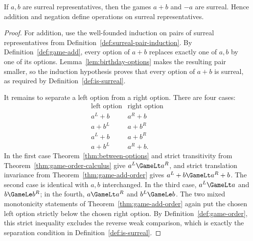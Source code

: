 \begin{theorem}
  \label{thm:surreal-add-closure}
  \leanok
  If \(a,b\) are surreal representatives, then the games \(a+b\) and \(-a\) are surreal.
  Hence addition and negation define operations on surreal representatives.
\end{theorem}
\begin{proof}
  \leanok
  For addition, use the well-founded induction on pairs of surreal
  representatives from Definition~\ref{def:surreal-pair-induction}.  By
  Definition~\ref{def:game-add}, every option of \(a+b\) replaces exactly one
  of \(a,b\) by one of its options.  Lemma~\ref{lem:birthday-options} makes
  the resulting pair smaller, so the induction hypothesis proves that every
  option of \(a+b\) is surreal, as required by
  Definition~\ref{def:is-surreal}.

  It remains to separate a left option from a right option.  There are four
  cases:
  \[
    \begin{array}{c|c}
      \text{left option}&\text{right option}\\ \hline
      a^L+b&a^R+b\\
      a+b^L&a+b^R\\
      a^L+b&a+b^R\\
      a+b^L&a^R+b.
    \end{array}
  \]
  In the first case Theorem~\ref{thm:between-options} and strict transitivity
  from Theorem~\ref{thm:game-order-calculus} give
  \(a^L\GameLt a^R\), and strict translation invariance from
  Theorem~\ref{thm:game-add-order} gives
  \(a^L+b\GameLt a^R+b\).  The second case is identical with \(a,b\)
  interchanged.  In the third case,
  \(a^L\GameLt a\) and \(b\GameLe b^R\); in the fourth,
  \(a\GameLt a^R\) and \(b^L\GameLe b\).  The two mixed monotonicity
  statements of Theorem~\ref{thm:game-add-order} again put the chosen left
  option strictly below the chosen right option.  By
  Definition~\ref{def:game-order}, this strict inequality excludes the reverse
  weak comparison, which is exactly the separation condition in
  Definition~\ref{def:is-surreal}.


\end{proof}
